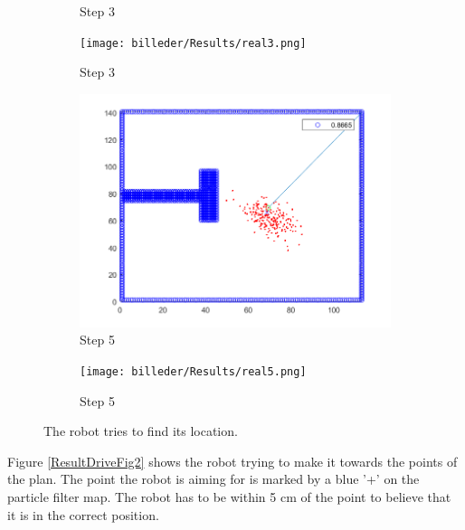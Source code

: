 \begin{figure}[H]
\begin{subfigure}{.5\textwidth}
  \caption{Step 3}
  \label{ResultDriveFig1:sub3}
\end{subfigure}%
\begin{subfigure}{.5\textwidth}
  \centering
  \texttt{[image: billeder/Results/real3.png]}
  \caption{Step 3}
  \label{ResultDriveFig1:sub4}
\end{subfigure}
\begin{subfigure}{.5\textwidth}
  \centering
  \includegraphics[width=.8\linewidth]{billeder/Results/5.png}
  \caption{Step 5}
  \label{ResultDriveFig1:sub5}
\end{subfigure}%
\begin{subfigure}{.5\textwidth}
  \centering
  \texttt{[image: billeder/Results/real5.png]}
  \caption{Step 5}
  \label{ResultDriveFig1:sub6}
\end{subfigure}
\caption{The robot tries to find its location.}
\label{ResultDriveFig1}
\end{figure}
Figure \ref{ResultDriveFig2} shows the robot trying to make it towards the points of the plan. The point the robot is aiming for is marked by a blue '+' on the particle filter map. The robot has to be within  5 cm of the point to believe that it is in the correct position.
